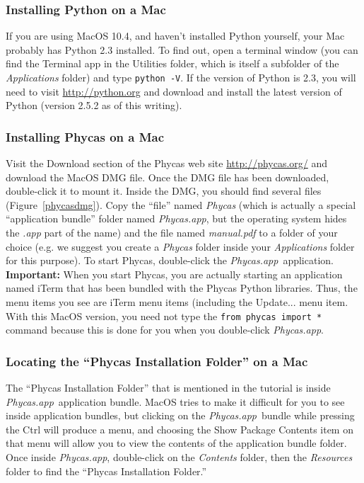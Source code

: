 \documentclass[10pt]{article}
\newcommand{\pathname}[1]{{\em #1}}			%
\newcommand{\menu}[1]{{\sf #1}}				%
\newcommand{\keycmd}[1]{{\sf #1}}			%
\newcommand{\code}[1]{{\tt #1}}				%
\newcommand{\phycasapp}{\pathname{Phycas.app}}
\begin{document}
\subsubsection{Installing Python on a Mac}

If you are using MacOS 10.4, and haven't installed Python yourself, your Mac probably has Python 2.3 installed. To find out, open a terminal window (you can find the Terminal app in the Utilities folder, which is itself a subfolder of the \pathname{Applications} folder) and type \code{python -V}. If the version of Python is 2.3, you will need to visit \url{http://python.org} and download and install the latest version of Python (version 2.5.2 as of this writing).

\subsubsection{Installing Phycas on a Mac}

Visit the Download section of the Phycas web site \url{http://phycas.org/} and download the MacOS DMG file. Once the DMG file has been downloaded, double-click it to mount it. Inside the DMG, you should find several files (Figure~\ref{phycasdmg}). Copy the ``file'' named \pathname{Phycas} (which is actually a special ``application bundle'' folder named \phycasapp, but the operating system hides the \pathname{.app} part of the name) and the file named \pathname{manual.pdf} to a folder of your choice (e.g. we suggest you create a \pathname{Phycas} folder inside your \pathname{Applications} folder for this purpose). To start Phycas, double-click the \phycasapp\ application. {\bf Important:} When you start Phycas, you are actually starting an application named iTerm that has been bundled with the Phycas Python libraries. Thus, the menu items you see are iTerm menu items (including the \menu{Update...} menu item. With this MacOS version, you need not type the \code{from phycas import *} command because this is done for you when you double-click \phycasapp.

\subsubsection{Locating the ``Phycas Installation Folder'' on a Mac} \label{subsubsec:installfoldermac}

The ``Phycas Installation Folder'' that is mentioned in the tutorial is inside \phycasapp\ application bundle. MacOS tries to make it difficult for you to see inside application bundles, but clicking on the \phycasapp\ bundle while pressing the \keycmd{Ctrl} will produce a menu, and choosing the \menu{Show Package Contents} item on that menu will allow you to view the contents of the application bundle folder. Once inside \phycasapp, double-click on the \pathname{Contents} folder, then the \pathname{Resources} folder to find the ``Phycas Installation Folder.''
\end{document}
